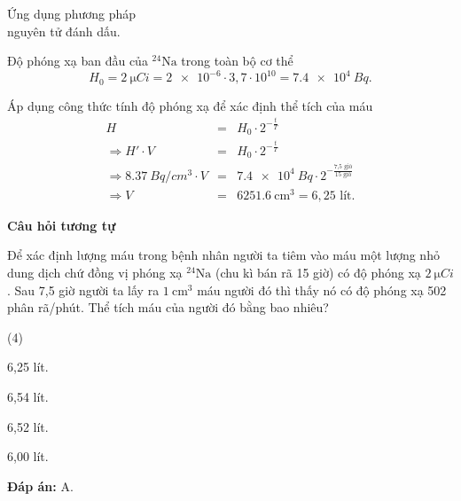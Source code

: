 \begin{dang}{Ứng dụng phương pháp\\ nguyên tử đánh dấu.}
{		Độ phóng xạ ban đầu của $^{24}\text{Na}$ trong toàn bộ cơ thể
		\begin{equation*}
		H_0=\SI{2}{\micro Ci}=\num{2e-6} \cdot 3,7 \cdot 10^{10}=\SI{7,4e4}{Bq}.
		\end{equation*}
		
		Áp dụng công thức tính độ phóng xạ để xác định thể tích của máu
		\begin{eqnarray*}
		H&=&H_0\cdot 2^{-\frac{t}{T}}\\
		\Rightarrow H'\cdot V&=&H_0\cdot 2^{-\frac{t}{T}}\\
		\Rightarrow \SI{8,37}{Bq/cm^3}\cdot V&=&\SI{7,4e4}{Bq}\cdot2^{-\frac{\text{7,5 giờ}}{\text{15 giờ}}}\\
		\Rightarrow V&=&\SI{6251,6}{\centi\meter^3}=6,25\textrm{ lít}.
		\end{eqnarray*}

		\begin{center}
			\textbf{Câu hỏi tương tự}
		\end{center}		
		
		Để xác định lượng máu trong bệnh nhân người ta tiêm vào máu một lượng nhỏ dung dịch chứ đồng vị phóng xạ $^{24}\text{Na}$ (chu kì bán rã 15 giờ) có độ phóng xạ $\SI{2}{\micro Ci}$. Sau 7,5 giờ người ta lấy ra $\SI{1}{\centi\meter^3}$ máu người đó thì thấy nó có độ phóng xạ 502 phân rã/phút. Thể tích máu của người đó bằng bao nhiêu?
		
		\begin{mcq}(4)
			\item 6,25 lít.
			\item 6,54 lít.
			\item 6,52 lít.
			\item 6,00 lít.
		\end{mcq}
		
		\textbf{Đáp án:} A.}
	\end{dang}

